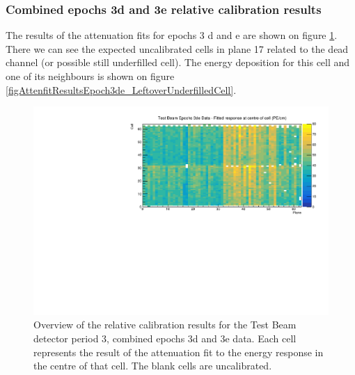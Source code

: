 \documentclass[12pt,a4paper]{article}
\begin{document}
\subsubsection*{Combined epochs 3d and 3e relative calibration results}

The results of the attenuation fits for epochs 3 d and e are shown on figure \ref{figCellCentreResponseEp3de}. There we can see the expected uncalibrated cells in plane 17 related to the dead channel (or possible still underfilled cell). The energy deposition for this cell and one of its neighbours is shown on figure \ref{figAttenfitResultsEpoch3de_LeftoverUnderfilledCell}.

\begin{figure}[!hbtp]
\centering
\includegraphics[width=\textwidth]{Plots/CellResponseAtCentre_epoch3de_Limited.pdf}
\caption{Overview of the relative calibration results for the Test Beam detector period 3, combined epochs 3d and 3e data. Each cell represents the result of the attenuation fit to the energy response in the centre of that cell. The blank cells are uncalibrated.}
\label{figCellCentreResponseEp3de}
\end{figure}
\end{document}
